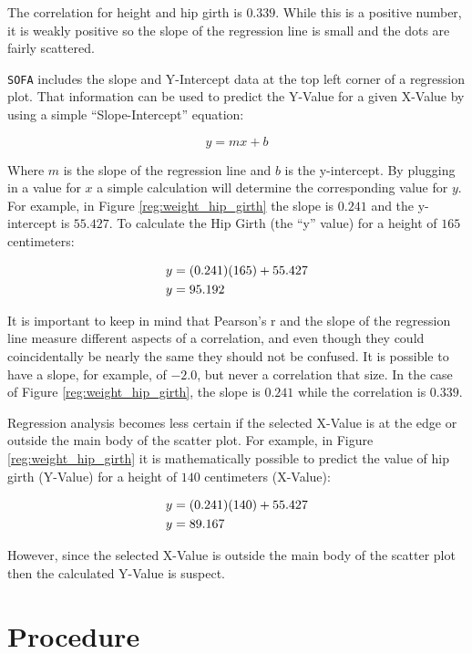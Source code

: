 The correlation for height and hip girth is $ 0.339 $. While this is a positive number, it is weakly positive so the slope of the regression line is small and the dots are fairly scattered.

\texttt{SOFA} includes the slope and Y-Intercept data at the top left corner of a regression plot. That information can be used to predict the Y-Value for a given X-Value by using a simple ``Slope-Intercept'' equation:

\[ y = mx + b \]

Where $ m $ is the slope of the regression line and $ b $ is the y-intercept. By plugging in a value for $ x $ a simple calculation will determine the corresponding value for $ y $. For example, in Figure \ref{reg:weight_hip_girth} the slope is $ 0.241 $ and the y-intercept is $ 55.427 $. To calculate the Hip Girth (the ``y'' value) for a height of $ 165 $ centimeters:

\begin{align}
\notag
  y &= (0.241)(165)+55.427 \\
  \notag
  y &= 95.192
\end{align}

It is important to keep in mind that Pearson's r and the slope of the regression line measure different aspects of a correlation, and even though they could coincidentally be nearly the same they should not be confused. It is possible to have a slope, for example, of $ -2.0 $, but never a correlation that size. In the case of Figure \ref{reg:weight_hip_girth}, the slope is $ 0.241 $ while the correlation is $ 0.339 $.

Regression analysis becomes less certain if the selected X-Value is at the edge or outside the main body of the scatter plot. For example, in Figure \ref{reg:weight_hip_girth} it is mathematically possible to predict the value of hip girth (Y-Value) for a height of $ 140 $ centimeters (X-Value):

\begin{align}
  \notag
  y &= (0.241)(140)+55.427 \\
  \notag
  y &= 89.167
\end{align}

However, since the selected X-Value is outside the main body of the scatter plot then the calculated Y-Value is suspect.

\section{Procedure}

